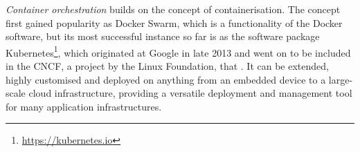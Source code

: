 \emph{Container orchestration} builds on the concept of containerisation.  The concept first gained popularity as Docker Swarm, which is a functionality of the Docker software, but its most successful instance so far is as the software package Kubernetes\footnote{\url{https://kubernetes.io}}, which originated at Google in late 2013 \parencite{kubernetesHistory} and went on to be included in the \ac{CNCF}, a project by the Linux Foundation, that . It can be extended, highly customised and deployed on anything from an embedded device to a large-scale cloud infrastructure, providing a versatile deployment and management tool for many application infrastructures.
